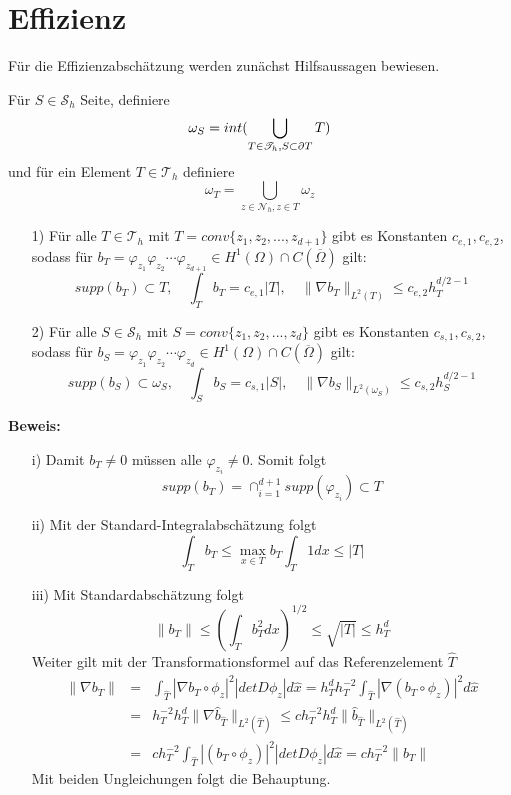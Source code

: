 \section{Effizienz}
Für die Effizienzabschätzung werden zunächst Hilfsaussagen bewiesen.
\begin{definition}
	Für $S \in \mathscr{S}_h$ Seite, definiere 
	\[
		\omega_S= int(\bigcup_{T\in\mathscr{T}_h,S\subset \partial T}T)
    \]
    und für ein Element $T \in \mathscr{T}_h$ definiere
    \[
    \omega_T = \bigcup_{z\in\mathscr{N}_h,z\in T} \omega_z
    \]
\end{definition}
\begin{lemma}
	\leavevmode
	\begin{itemize}
		\item[1)]
		Für alle $T\in\mathscr{T}_h$ mit $T =conv\{z_1,z_2,...,z_{d+1}\}$ gibt es Konstanten $c_{e,1},c_{e,2}$,  sodass für $b_T = \varphi_{z_1}\varphi_{z_2}\cdots\varphi_{z_{d+1}} \in H^1(\Omega)\cap C(\overline{\Omega})$ gilt:
		\[
		supp(b_T)\subset T,\quad \int_{T} b_T =c_{e,1} |T|, \quad \|\nabla b_T\|_{L^2(T)} \leq c_{e,2}h_T^{d/2-1}
		\]
		\item[2)]
		Für alle $S\in\mathscr{S}_h$ mit $S =conv\{z_1,z_2,...,z_{d}\}$ gibt es Konstanten $c_{s,1},c_{s,2}$,  sodass für $b_S = \varphi_{z_1}\varphi_{z_2}\cdots\varphi_{z_{d}} \in H^1(\Omega)\cap C(\overline{\Omega})$ gilt:
		\[
		supp(b_S)\subset \omega_S,\quad \int_{S} b_S =c_{s,1} |S|, \quad \|\nabla b_S\|_{L^2(\omega_S)} \leq c_{s,2}h_S^{d/2-1}
		\]
	\end{itemize}
\end{lemma}
\textbf{Beweis:}
\begin{itemize}
	\item[i)] Damit $b_T\neq0$ müssen alle $\varphi_{z_{i}}\neq 0$. Somit folgt\[
	supp(b_T) = \cap_{i=1}^{d+1}supp(\varphi_{z_i})\subset T
	\]
	\item[ii)] Mit der Standard-Integralabschätzung folgt \[
	\int_{T}b_T \leq \max_{x\in T}b_T \int_{T}1 dx \leq |T|
	\]
	\item[iii)] Mit Standardabschätzung folgt \[
	\|b_T\| \leq \left(\int_{T}b_T^2dx\right)^{1/2} \leq \sqrt{|T|}\leq h_T^d
	\] Weiter gilt mit der Transformationsformel auf das Referenzelement $\hat{T}$
	\begin{eqnarray*}
		\|\nabla b_T\| &=& \int_{\hat{T}} |\nabla b_{T}\circ \phi_z|^2 | detD\phi_z|d\hat{x} = h_T^dh^{-2}_T\int_{\hat{T}} |\nabla (b_T\circ \phi_z)|^2 d\hat{x} \\
		&=& h^{-2}_T h_T^d\| \nabla \widehat{b}_{\hat{T}}\|_{L^2(\hat{T})} \leq c h^{-2}_T h_T^d \|\widehat{b}_{\hat{T}}\|_{L^2(\hat{T})} \\
		&=& ch^{-2}_T\int_{\hat{T}} | (b_T\circ \phi_z)|^2 | detD\phi_z| d\hat{x}= ch^{-2}_T \| b_T\|
	\end{eqnarray*}
	Mit beiden Ungleichungen folgt die Behauptung.
\end{itemize}
